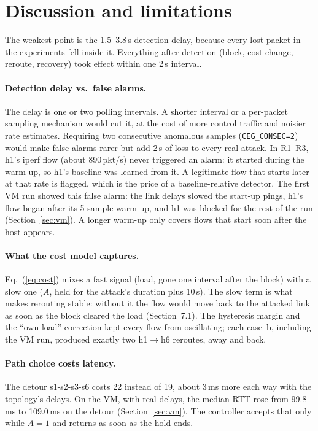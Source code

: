 \documentclass[11pt,a4paper]{article}
\newcommand{\ra}{\ensuremath{\rightarrow}}
\newcommand{\code}[1]{\texttt{#1}}
\begin{document}
\section{Discussion and limitations}

The weakest point is the 1.5--3.8\,s detection delay, because every lost packet in the experiments fell inside it.
Everything after detection (block, cost change, reroute, recovery) took effect within one 2\,s interval.

\paragraph{Detection delay vs.\ false alarms.} The delay is one or two polling intervals. A shorter interval or a
per-packet sampling mechanism would cut it, at the cost of more control traffic and noisier rate estimates.
Requiring two consecutive anomalous samples (\code{CEG\_CONSEC=2}) would make false alarms rarer but add 2\,s of
loss to every real attack. In R1--R3, h1's iperf flow (about 890\,pkt/s) never triggered an alarm: it started
during the warm-up, so h1's baseline was learned from it. A legitimate flow that starts later at that rate is
flagged, which is the price of a baseline-relative detector. The first VM run showed this false alarm: the link
delays slowed the start-up pings, h1's flow began after its 5-sample warm-up, and h1 was blocked for the rest of
the run (Section~\ref{sec:vm}). A longer warm-up only covers flows that start soon after the host appears.

\paragraph{What the cost model captures.} Eq.~(\ref{eq:cost}) mixes a fast signal (load, gone one interval after
the block) with a slow one ($A$, held for the attack's duration plus 10\,s). The slow term is what makes rerouting
stable: without it the flow would move back to the attacked link as soon as the block cleared the load
(Section~7.1). The hysteresis margin and the ``own load'' correction kept every flow from oscillating; each case~b,
including the VM run, produced exactly two h1\ra h6 reroutes, away and back.

\paragraph{Path choice costs latency.} The detour s1-s2-s3-s6 costs 22 instead of 19, about 3\,ms more each way
with the topology's delays. On the VM, with real delays, the median RTT rose from 99.8\,ms to 109.0\,ms on the
detour (Section~\ref{sec:vm}). The controller accepts that only while $A=1$ and returns as soon as the hold ends.
\end{document}
